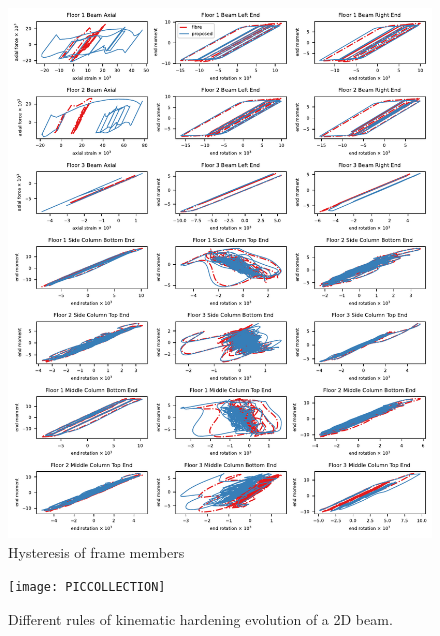 \documentclass[3p,authoryear,11pt,fleqn,review]{elsarticle}
\begin{document}
\begin{figure}[p]
\centering\footnotesize
\includegraphics[width=.99\textwidth]{MODELS/FRAME/RESULT/FRAME.RESULT}
\caption{Hysteresis of frame members}\label{fig:hys}
\end{figure}
\begin{figure}[p]
\centering\footnotesize
\texttt{[image: PICCOLLECTION]}
\caption{Different rules of kinematic hardening evolution of a 2D beam.}\label{fig:nm_component_kin}
\end{figure}
\end{document}
